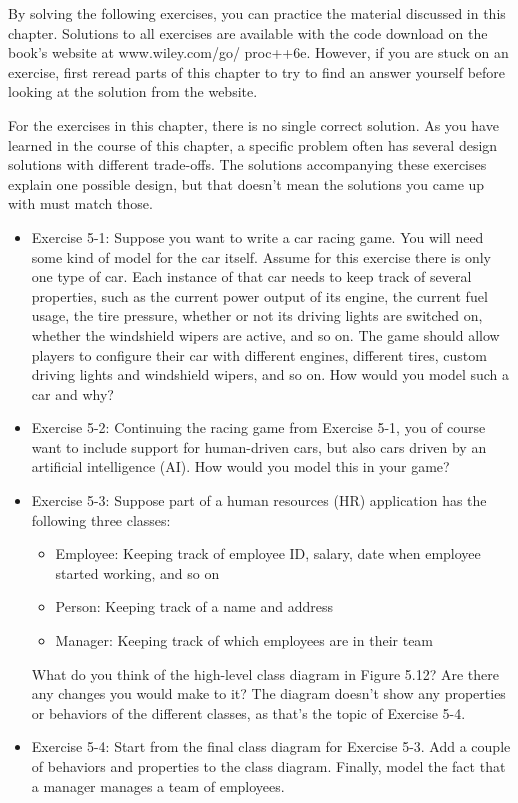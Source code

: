 By solving the following exercises, you can practice the material discussed in this chapter. Solutions to all exercises are available with the code download on the book’s website at www.wiley.com/go/ proc++6e. However, if you are stuck on an exercise, first reread parts of this chapter to try to find an answer yourself before looking at the solution from the website.

For the exercises in this chapter, there is no single correct solution. As you have learned in the course of this chapter, a specific problem often has several design solutions with different trade-offs. The solutions accompanying these exercises explain one possible design, but that doesn’t mean the solutions you came up with must match those.

\begin{itemize}
\item
Exercise 5-1: Suppose you want to write a car racing game. You will need some kind of model for the car itself. Assume for this exercise there is only one type of car. Each instance of that car needs to keep track of several properties, such as the current power output of its engine, the current fuel usage, the tire pressure, whether or not its driving lights are switched on, whether the windshield wipers are active, and so on. The game should allow players to configure their car with different engines, different tires, custom driving lights and windshield wipers, and so on. How would you model such a car and why?

\item
Exercise 5-2: Continuing the racing game from Exercise 5-1, you of course want to include support for human-driven cars, but also cars driven by an artificial intelligence (AI). How would you model this in your game?

\item
Exercise 5-3: Suppose part of a human resources (HR) application has the following three classes:

\begin{itemize}
\item
Employee: Keeping track of employee ID, salary, date when employee started working, and so on

\item
Person: Keeping track of a name and address

\item
Manager: Keeping track of which employees are in their team
\end{itemize}

What do you think of the high-level class diagram in Figure 5.12? Are there any changes you would make to it? The diagram doesn’t show any properties or behaviors of the different classes, as that’s the topic of Exercise 5-4.


\item
Exercise 5-4: Start from the final class diagram for Exercise 5-3. Add a couple of behaviors and properties to the class diagram. Finally, model the fact that a manager manages a team of employees.
\end{itemize}







